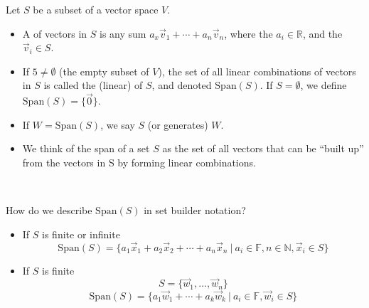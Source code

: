 \documentclass[11pt,fleqn]{book} %
\begin{document}
\setcounter{section}{3}
\setcounter{definitionT}{0}
\begin{definition}
    Let $S$ be a subset of a vector space $V$.

    \begin{itemize}
        \item A  of vectors in $S$ is any sum $a_x\vec{v}_1 + \cdots + a_n\vec{v}_n$, where the $a_i \in \mathbb{R}$, and the $\vec{v}_i \in S$.

        \item If $5 \neq \emptyset$ (the empty subset of $V$), the set of all linear combinations of vectors in $S$ is called the (linear)  of $S$, and denoted $\mathrm{Span}(S)$. If $S = \emptyset$, we define $\mathrm{Span}(S) = \{ \vec{0} \}$.

        \item If $W = \mathrm{Span}(S)$, we say $S$  (or generates) $W$.

        \item We think of the span of a set $S$ as the set of all vectors that can be ``built up'' from the vectors in S by forming linear combinations.
    \end{itemize}
\end{definition}
\setcounter{section}{4}

{~~~}

How do we describe $\mathrm{Span}(S)$ in set builder notation?
\begin{itemize}
  \item If $S$ is finite or infinite
  $$\mathrm{Span}(S) = \{ a_1\vec{x}_1 + a_2\vec{x}_2 + \cdots + a_n\vec{x}_n ~|~ a_i \in \mathbb{F}, n \in \mathbb{N}, \vec{x}_i \in S \}$$

  \item If $S$ is finite
  $$S = \{ \vec{w}_1 , \dots, \vec{w}_n \}$$
  $$\mathrm{Span}\left( S \right) = \{ a_1\vec{w}_1 + \cdots + a_k\vec{w}_k ~|~ a_i \in \mathbb{F}, \vec{w}_i \in S \}$$
\end{itemize}
\end{document}
